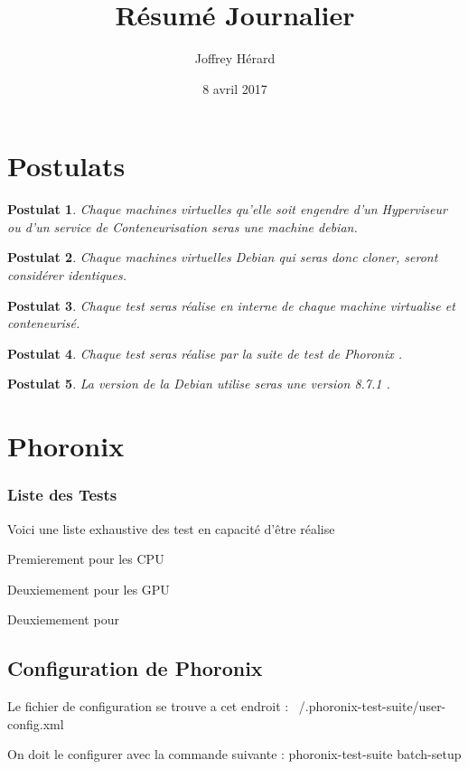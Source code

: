 \documentclass[french]{article}
\newtheorem{post}{Postulat}
\begin{document}
\title{Résumé Journalier}
\author{Joffrey Hérard}
\date{8 avril 2017} 

\maketitle

\section{Postulats}

\begin{post}
Chaque machines virtuelles qu'elle soit engendre d'un Hyperviseur ou d'un service de Conteneurisation seras une machine debian.  
\end{post}
\begin{post}
Chaque machines virtuelles Debian qui seras donc cloner, seront considérer identiques. 
\end{post}
\begin{post}
Chaque test seras réalise en interne de chaque machine virtualise et conteneurisé.
\end{post}
\begin{post}
Chaque test seras réalise par la suite de test de Phoronix .
\end{post}
\begin{post}
La version de la Debian utilise seras une version 8.7.1 .
\end{post}
\section{Phoronix}
\subsubsection{Liste des Tests }
Voici une liste exhaustive des test en capacité d’être réalise

Premierement pour les CPU 

Deuxiemement pour les GPU 

Deuxiemement pour 

\subsection{Configuration de Phoronix}
Le fichier de configuration se trouve a cet endroit : \newline
~/.phoronix-test-suite/user-config.xml

On doit le configurer avec la commande suivante : phoronix-test-suite batch-setup 
\end{document}
